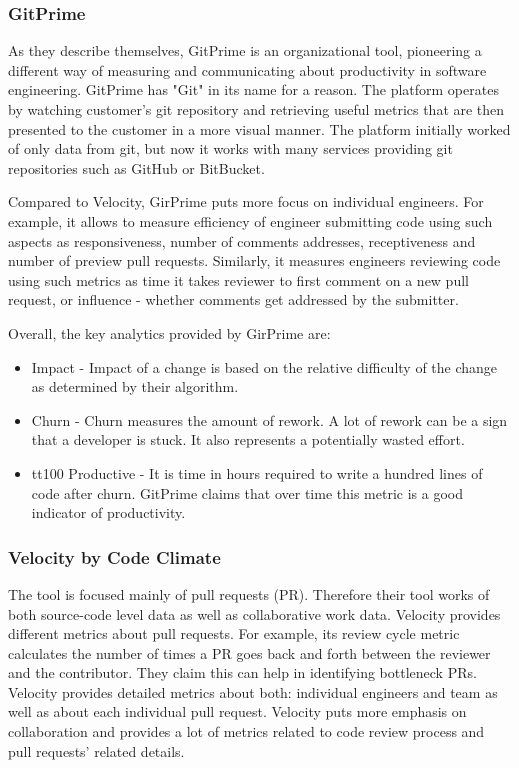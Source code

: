\documentclass[11pt]{article}
\begin{document}
\subsubsection{GitPrime}
As they describe themselves, GitPrime is an organizational tool, pioneering a different way of measuring and communicating about productivity in software engineering. GitPrime has "Git" in its name for a reason. The platform operates by watching customer's git repository and retrieving useful metrics that are then presented to the customer in a more visual manner. The platform initially worked of only data from git, but now it works with many services providing git repositories such as GitHub or BitBucket. 
\par 
Compared to Velocity, GirPrime puts more focus on individual engineers. For example, it allows to measure efficiency of engineer submitting code using such aspects as responsiveness, number of comments addresses, receptiveness and number of preview pull requests. Similarly, it measures engineers reviewing code using such metrics as time it takes reviewer to first comment on a new pull request, or influence - whether comments get addressed by the submitter.
\par 
Overall, the key analytics provided by GirPrime are:
\begin{itemize}
	\item Impact - Impact of a change is based on the relative difficulty of the change as determined by their algorithm.
	\item Churn - Churn measures the amount of rework. A lot of rework can be a sign that a developer is stuck. It also represents a potentially wasted effort.
	\item tt100 Productive - It is time in hours required to write a hundred lines of code after churn. GitPrime claims that over time this metric is a good indicator of productivity.
\end{itemize}
\subsubsection{Velocity by Code Climate}
The tool is focused mainly of pull requests (PR). Therefore their tool works of both source-code level data as well as collaborative work data. Velocity provides different metrics about pull requests. For example, its review cycle metric calculates the number of times a PR goes back and forth between the reviewer and the contributor. They claim this can help in identifying bottleneck PRs. Velocity provides detailed metrics about both: individual engineers and team as well as about each individual pull request. Velocity puts more emphasis on collaboration and provides a lot of metrics related to code review process and pull requests' related details.
\end{document}
